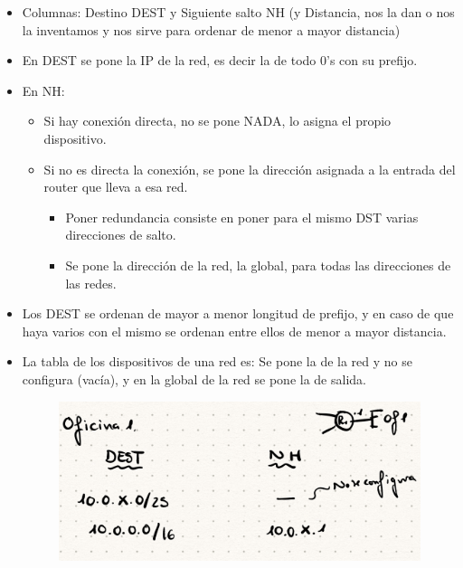 \documentclass[12pt, twoside, openright]{report} %
\begin{document}
\begin{itemize}
	\item Columnas: Destino DEST y Siguiente salto NH (y Distancia, nos la
	      dan o nos la inventamos y nos sirve para ordenar de menor a mayor
	      distancia)
	\item En DEST se pone la IP de la red, es decir la de todo 0's con su
	      prefijo.
	\item En NH:

	      \begin{itemize}
		      \item Si hay conexión directa, no se pone NADA, lo asigna el propio
		            dispositivo.
		      \item Si no es directa la conexión, se pone la dirección asignada a la
		            entrada del router que lleva a esa red.

		            \begin{itemize}
			            \item Poner redundancia consiste en poner para el mismo DST varias
			                  direcciones de salto.
			            \item Se pone la dirección de la red, la global, para todas las
			                  direcciones de las redes.
		            \end{itemize}
	      \end{itemize}
	\item Los DEST se ordenan de mayor a menor longitud de prefijo, y en
	      caso de que haya varios con el mismo se ordenan entre ellos de
	      menor a mayor distancia.
	\item La tabla de los dispositivos de una red es: Se pone la de la red y
	      no se configura (vacía), y en la global de la red se pone la de
	      salida.
	      \begin{figure}[H]
		      {\includegraphics[scale=.2]{Untitled 32.png}}
	      \end{figure}
\end{itemize}
\end{document}
